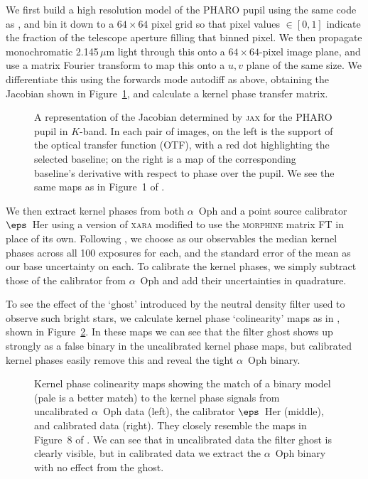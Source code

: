 \documentclass[modern]{aastex63}
\begin{document}
We first build a high resolution model of the PHARO pupil using the same code as \citet{martinache20}, and bin it down to a $64\times64$ pixel grid so that pixel values $\in [0,1]$ indicate the fraction of the telescope aperture filling that binned pixel. We then propagate monochromatic 2.145\,$\mu$m light through this onto a $64\times64$-pixel image plane, and use a matrix Fourier transform to map this onto a $u,v$ plane of the same size. We differentiate this using the forwards mode autodiff as above, obtaining the Jacobian shown in Figure~\ref{pharo_jacobian}, and calculate a kernel phase transfer matrix.

\begin{figure}
\caption{A representation of the Jacobian determined by \textsc{jax} for the PHARO pupil in $K$-band. In each pair of images, on the left is the support of the optical transfer function (OTF), with a red dot highlighting the selected baseline; on the right is a map of the corresponding baseline's derivative with respect to phase over the pupil. We see the same maps as in Figure~1 of \citet{martinache10}. \label{pharo_jacobian}}
\end{figure}

We then extract kernel phases from both $\alpha$~Oph and a point source calibrator $\eps$~Her using a version of \textsc{xara} modified to use the \textsc{morphine} matrix FT in place of its own. Following \citet{martinache20}, we choose as our observables the median kernel phases across all 100 exposures for each, and the standard error of the mean as our base uncertainty on each. To calibrate the kernel phases, we simply subtract those of the calibrator from $\alpha$~Oph and add their uncertainties in quadrature. 

To see the effect of the `ghost' introduced by the neutral density filter used to observe such bright stars, we calculate kernel phase `colinearity' maps as in \citet{martinache20}, shown in Figure~\ref{colinearity}. In these maps we can see that the filter ghost shows up strongly as a false binary in the uncalibrated kernel phase maps, but calibrated kernel phases easily remove this and reveal the tight $\alpha$~Oph binary.


\begin{figure}
\caption{Kernel phase colinearity maps showing the match of a binary model (pale is a better match) to the kernel phase signals from uncalibrated $\alpha$~Oph data (left), the calibrator $\eps$~Her (middle), and calibrated data (right). They closely resemble the maps in Figure~8 of \citet{martinache20}. We can see that in uncalibrated data the filter ghost is clearly visible, but in calibrated data we extract the $\alpha$~Oph binary with no effect from the ghost. \label{colinearity}}
\end{figure}
\end{document}
